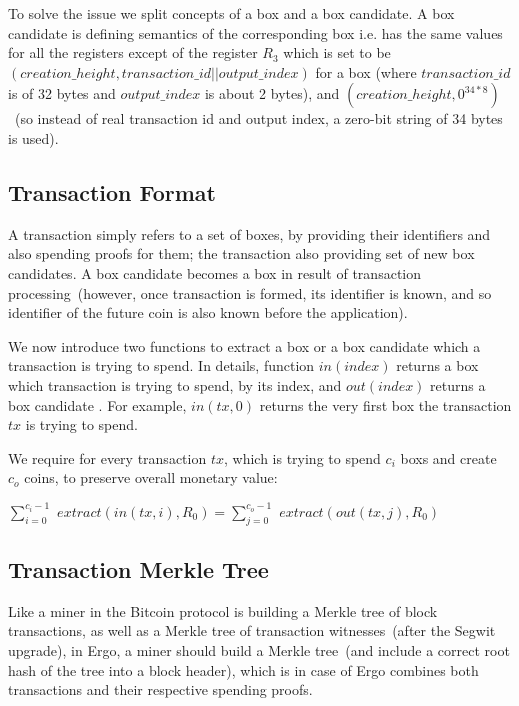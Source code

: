 \documentclass[]{article}   %
\newcommand{\coin}{box}
\newcommand{\extract}[1]{$extract({#1})$}
\begin{document}
To solve the issue we split concepts of a \coin{} and a \coin{} candidate. A \coin{} candidate is defining semantics of
the corresponding \coin{} i.e. has the same values for all the registers except of the register $R_3$ which is set to
be $(creation\_height, transaction\_id || output\_index)$ for a box (where $transaction\_id$ is of 32 bytes and
$output\_index$ is about 2 bytes), and $(creation\_height, 0^{34*8})$~(so instead of real transaction id and output index,
a zero-bit string of 34 bytes is used).


\subsection{Transaction Format}
\label{tx-format}

A transaction simply refers to a set of \coin{}es, by providing their identifiers and also spending proofs for
them; the transaction also providing set of new \coin{} candidates. A \coin{} candidate becomes a \coin{} in result of
transaction processing~(however, once transaction is formed, its identifier is known, and so identifier of the future
coin is also known before the application).

We now introduce two functions to extract a \coin{} or a \coin{} candidate which a transaction is trying to spend.
 In details, function $in(index)$ returns a \coin{} which transaction is trying to spend, by its index, and $out(index)$
 returns a \coin{} candidate . For example, $in(tx, 0)$ returns the very first \coin{} the transaction $tx$ is trying to spend.

We require for every transaction $tx$, which is trying to spend $c_i$ {\coin}s and create $c_o$ coins,
to preserve overall monetary value:

$ \sum_{i=0}^{c_i - 1}$ \extract{in(tx,i), R_0}$ = \sum_{j=0}^{c_o - 1}$ \extract{out(tx,j), R_0}

\subsection{Transaction Merkle Tree}
\label{tx-tree}

Like a miner in the Bitcoin protocol is building a Merkle tree of block transactions, as well as a Merkle tree of
transaction witnesses~(after the Segwit upgrade), in Ergo, a miner should build a Merkle tree~(and include a correct
 root hash of the tree into a block header), which is in case of Ergo combines both transactions and their respective
 spending proofs.
\end{document}
